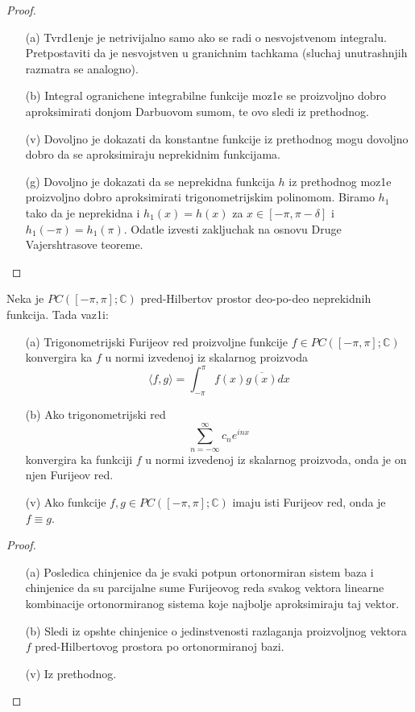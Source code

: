 \documentclass[a4paper,12pt]{article}
\newcommand{\CC}{\mathbb{C}}
\begin{document}
\begin{proof}
\begin{itemize}
\item[(a)] Tvrd1enje je netrivijalno samo ako se radi o nesvojstvenom integralu. Pret\-po\-sta\-vi\-ti da je nesvojstven u granichnim tachkama (sluchaj unutrashnjih razmatra se analogno).
\item[(b)] Integral ogranichene integrabilne funkcije moz1e se proizvoljno dobro aproksi\-mi\-ra\-ti donjom Darbuovom sumom, te ovo sledi iz prethodnog.
\item[(v)] Dovoljno je dokazati da konstantne funkcije iz prethodnog mogu dovoljno dobro da se aprok\-si\-mi\-ra\-ju neprekidnim funkcijama. 
\item[(g)] Dovoljno je dokazati da se neprekidna funkcija $h$ iz prethodnog moz1e proizvoljno dobro aproksimirati trigonometrijskim polinomom. Biramo $h_1$ tako da je nepre\-ki\-dna i $h_1(x) = h(x)$ za $x \in [-\pi, \pi - \delta]$ i $h_1(-\pi) = h_1(\pi)$. Odatle izvesti zakljuchak na osnovu Druge Vajershtrasove teoreme.
\end{itemize}
\end{proof}
\begin{posl}
Neka je $PC([-\pi, \pi]; \CC)$ pred-Hilbertov prostor deo-po-deo neprekidnih funkcija. Tada vaz1i:
\begin{itemize}
\item[(a)] Trigonometrijski Furijeov red proizvoljne funkcije $f \in PC([-\pi, \pi]; \CC)$ konvergira ka $f$ u normi izvedenoj iz skalarnog proizvoda \[\langle f, g \rangle = \int_{-\pi}^{\pi} f(x) \overline{g(x)} dx \]
\item[(b)] Ako trigonometrijski red
\[\sum_{n = -\infty}^{\infty} c_n e^{inx}\]
konvergira ka funkciji $f$ u normi izvedenoj iz skalarnog proizvoda, onda je on njen Furijeov red.
\item[(v)] Ako funkcije $f,g \in PC([-\pi, \pi]; \CC)$ imaju isti Furijeov red, onda je $f \equiv g$.
\end{itemize}
\end{posl}
\begin{proof}
\begin{itemize}
\item[(a)] Posledica chinjenice da je svaki potpun ortonormiran sistem baza i chinjeni\-ce da su parcijalne sume Furijeovog reda svakog vektora linearne kombinacije or\-to\-nor\-mi\-ra\-nog sistema koje najbolje aproksimiraju taj vektor.
\item[(b)] Sledi iz opshte chinjenice o jedinstvenosti razlaganja proizvoljnog vektora $f$ pred-Hilbertovog prostora po ortonormiranoj bazi.
\item[(v)] Iz prethodnog.
\end{itemize}
\end{proof}
\end{document}
